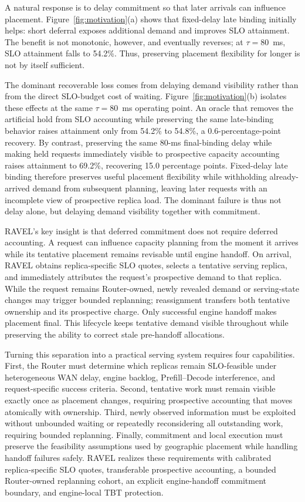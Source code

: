 \documentclass[letterpaper,twocolumn,10pt]{article}
\begin{document}
A natural response is to delay commitment so that later arrivals can influence
placement.
Figure~\ref{fig:motivation}(a) shows that fixed-delay late binding initially
helps: short deferral exposes additional demand and improves SLO attainment.
The benefit is not monotonic, however, and eventually reverses; at
$\tau=80$~ms, SLO attainment falls to 54.2\%.
Thus, preserving placement flexibility for longer is not by itself sufficient.

The dominant recoverable loss comes from delaying demand visibility rather than
from the direct SLO-budget cost of waiting.
Figure~\ref{fig:motivation}(b) isolates these effects at the same
$\tau=80$~ms operating point.
An oracle that removes the artificial hold from SLO accounting while preserving
the same late-binding behavior raises attainment only from 54.2\% to 54.8\%,
a 0.6-percentage-point recovery.
By contrast, preserving the same 80-ms final-binding delay while making held
requests immediately visible to prospective capacity accounting raises
attainment to 69.2\%, recovering 15.0 percentage points.
Fixed-delay late binding therefore preserves useful placement flexibility while
withholding already-arrived demand from subsequent planning, leaving later
requests with an incomplete view of prospective replica load.
The dominant failure is thus not delay alone, but delaying demand visibility
together with commitment.

RAVEL's key insight is that deferred commitment does not require deferred
accounting.
A request can influence capacity planning from the moment it arrives while its
tentative placement remains revisable until engine handoff.
On arrival, RAVEL obtains replica-specific SLO quotes, selects a tentative
serving replica, and immediately attributes the request's prospective demand
to that replica.
While the request remains Router-owned, newly revealed demand or serving-state
changes may trigger bounded replanning; reassignment transfers both tentative
ownership and its prospective charge.
Only successful engine handoff makes placement final.
This lifecycle keeps tentative demand visible throughout while preserving the
ability to correct stale pre-handoff allocations.

Turning this separation into a practical serving system requires four
capabilities.
First, the Router must determine which replicas remain SLO-feasible under
heterogeneous WAN delay, engine backlog, Prefill--Decode interference, and
request-specific success criteria.
Second, tentative work must remain visible exactly once as placement changes,
requiring prospective accounting that moves atomically with ownership.
Third, newly observed information must be exploited without unbounded waiting
or repeatedly reconsidering all outstanding work, requiring bounded
replanning.
Finally, commitment and local execution must preserve the feasibility
assumptions used by geographic placement while handling handoff failures
safely.
RAVEL realizes these requirements with calibrated replica-specific SLO quotes,
transferable prospective accounting, a bounded Router-owned replanning cohort,
an explicit engine-handoff commitment boundary, and engine-local TBT
protection.
\end{document}
